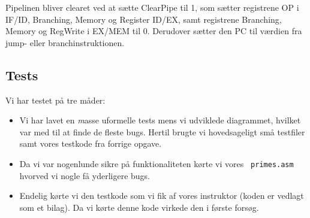 Pipelinen bliver clearet ved at sætte ClearPipe til 1, som sætter registrene OP i IF/ID, Branching, Memory og Register
ID/EX, samt registrene Branching, Memory og RegWrite i EX/MEM til 0. Derudover sætter den PC til værdien
fra jump- eller branchinstruktionen. 

\subsection{Tests}
Vi har testet på tre måder:
\begin{itemize}
\item Vi har lavet en {\emph masse} uformelle tests mens vi udviklede
diagrammet, hvilket var med til at finde de fleste bugs. Hertil brugte vi
hovedsageligt små testfiler samt vores testkode fra forrige opgave.
\item Da vi var nogenlunde sikre på funktionaliteten kørte vi vores {\tt
primes.asm} hvorved vi nogle få yderligere bugs.
\item Endelig kørte vi den testkode som vi fik af vores instruktor (koden er
vedlagt som et bilag). Da vi kørte denne kode virkede den i første forsøg.
\end{itemize}
